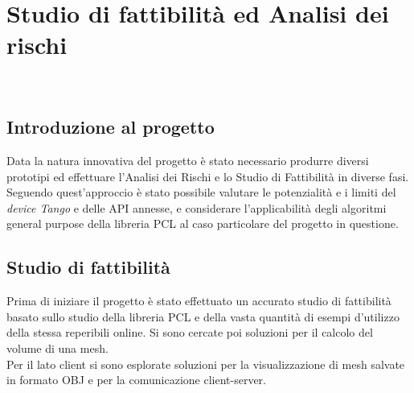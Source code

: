 
\chapter{Studio di fattibilità ed Analisi dei rischi}

\\

\section{Introduzione al progetto}

Data la natura innovativa del progetto è stato necessario produrre diversi prototipi ed
effettuare l’Analisi dei Rischi e lo Studio di Fattibilità in diverse fasi.
Seguendo quest'approccio è stato possibile valutare le potenzialità e i limiti del \emph{device Tango} e delle API annesse, e considerare l'applicabilità degli algoritmi general purpose della libreria PCL al caso particolare del progetto in questione.

\section{Studio di fattibilità}
Prima di iniziare il progetto è stato effettuato un accurato studio di fattibilità basato sullo studio della libreria PCL e della vasta quantità di esempi d'utilizzo della stessa reperibili online. Si sono cercate poi soluzioni per il calcolo del volume di una mesh.\\
Per il lato client si sono esplorate soluzioni per la visualizzazione di mesh salvate in formato OBJ e per la comunicazione client-server.

